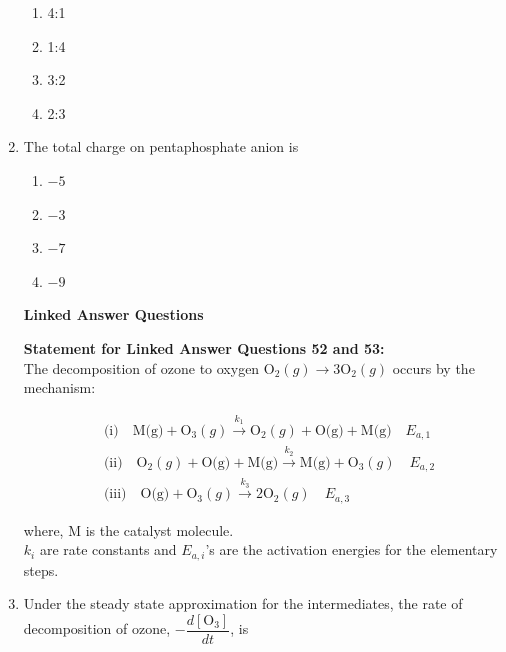 \documentclass[journal,12pt,onecolumn]{IEEEtran}
\theoremstyle{remark}
\begin{document}
\begin{enumerate}
\begin{multicols}{2}
\begin{enumerate}
    \item 4:1
    \item 1:4
    \item 3:2
    \item 2:3
\end{enumerate}
\end{multicols}

 

\item    \hspace{0.5cm} The total charge on pentaphosphate anion is  \hfill{}

\begin{multicols}{2}
\begin{enumerate}
    \item $-5$
    \item $-3$
    \item $-7$
    \item $-9$
\end{enumerate}
\end{multicols}
 



\noindent\textbf{Linked Answer Questions}
 
\noindent\textbf{Statement for Linked Answer Questions 52 and 53:}
 \\
The decomposition of ozone to oxygen \( \text{O}_2 (g) \rightarrow 3\text{O}_2(g) \) occurs by the mechanism:

\begin{align*}
&\text{(i)} \quad \text{M(g)} + \text{O}_3 (g) \xrightarrow{k_1} \text{O}_2 (g) + \text{O(g)} + \text{M(g)} \quad E_{a,1} \\
&\text{(ii)} \quad \text{O}_2 (g) + \text{O(g)} + \text{M(g)} \xrightarrow{k_2} \text{M(g)} + \text{O}_3 (g) \quad E_{a,2} \\
&\text{(iii)} \quad \text{O(g)} + \text{O}_3 (g) \xrightarrow{k_3} 2\text{O}_2 (g) \quad E_{a,3}
\end{align*}

where, M is the catalyst molecule.\\
\(k_i\) are rate constants and \(E_{a,i}\)'s are the activation energies for the elementary steps.

 \newpage

\item    \hspace{0.5cm} Under the steady state approximation for the intermediates, the rate of decomposition of ozone, \( -\dfrac{d[\text{O}_3]}{dt} \), is  \hfill{}


\end{enumerate}
\end{document}
